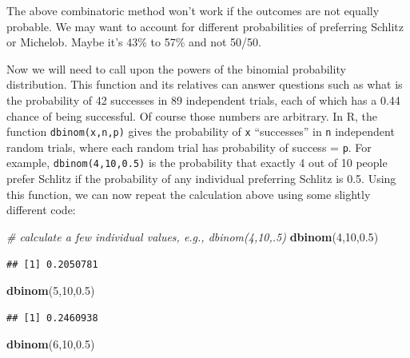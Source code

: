 \documentclass[openany]{book}
\newenvironment{Shaded}{\begin{snugshade}}{\end{snugshade}}
\newcommand{\CommentTok}[1]{\textcolor[rgb]{0.56,0.35,0.01}{\textit{#1}}}
\newcommand{\DecValTok}[1]{\textcolor[rgb]{0.00,0.00,0.81}{#1}}
\newcommand{\FloatTok}[1]{\textcolor[rgb]{0.00,0.00,0.81}{#1}}
\newcommand{\KeywordTok}[1]{\textcolor[rgb]{0.13,0.29,0.53}{\textbf{#1}}}
\newcommand{\NormalTok}[1]{#1}
\begin{document}
The above combinatoric method won't work if the outcomes are not equally probable. We may want to account for different probabilities of preferring Schlitz or Michelob. Maybe it's 43\% to 57\% and not 50/50.

Now we will need to call upon the powers of the binomial probability distribution. This function and its relatives can answer questions such as what is the probability of 42 successes in 89 independent trials, each of which has a 0.44 chance of being successful. Of course those numbers are arbitrary. In R, the function \texttt{dbinom(x,n,p)} gives the probability of \texttt{x} ``successes'' in \texttt{n} independent random trials, where each random trial has probability of success = \texttt{p}. For example, \texttt{dbinom(4,10,0.5)} is the probability that exactly 4 out of 10 people prefer Schlitz if the probability of any individual preferring Schlitz is 0.5. Using this function, we can now repeat the calculation above using some slightly different code:

\begin{Shaded}
\begin{Highlighting}[]
\CommentTok{# calculate a few individual values, e.g., dbinom(4,10,.5)}
\KeywordTok{dbinom}\NormalTok{(}\DecValTok{4}\NormalTok{,}\DecValTok{10}\NormalTok{,}\FloatTok{0.5}\NormalTok{)}
\end{Highlighting}
\end{Shaded}

\begin{verbatim}
## [1] 0.2050781
\end{verbatim}

\begin{Shaded}
\begin{Highlighting}[]
\KeywordTok{dbinom}\NormalTok{(}\DecValTok{5}\NormalTok{,}\DecValTok{10}\NormalTok{,}\FloatTok{0.5}\NormalTok{)}
\end{Highlighting}
\end{Shaded}

\begin{verbatim}
## [1] 0.2460938
\end{verbatim}

\begin{Shaded}
\begin{Highlighting}[]
\KeywordTok{dbinom}\NormalTok{(}\DecValTok{6}\NormalTok{,}\DecValTok{10}\NormalTok{,}\FloatTok{0.5}\NormalTok{)}
\end{Highlighting}
\end{Shaded}
\end{document}
